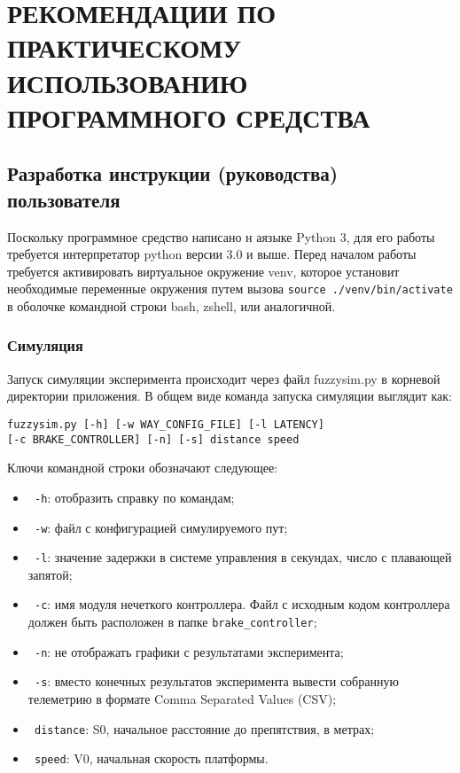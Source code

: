 \lstset{style=pythoninlinestyle}

\section{РЕКОМЕНДАЦИИ ПО ПРАКТИЧЕСКОМУ ИСПОЛЬЗОВАНИЮ ПРОГРАММНОГО СРЕДСТВА}
\label{sec:manual}

\subsection{Разработка инструкции (руководства) пользователя}
\label{sub:manual:1}

Поскольку программное средство написано н аязыке Python 3, для его работы требуется интерпретатор python версии 3.0 и выше. Перед началом работы  требуется активировать виртуальное окружение venv, которое установит необходимые переменные окружения путем вызова \lstinline!source ./venv/bin/activate! в оболочке командной строки bash, zshell, или аналогичной.

\subsubsection{Симуляция}

Запуск симуляции эксперимента происходит через файл fuzzysim.py в корневой директории приложения. В общем виде команда запуска симуляции выглядит как:

\begin{lstlisting}[style=pythonstyle,caption={  }, label=lst:func:1]
  fuzzysim.py [-h] [-w WAY_CONFIG_FILE] [-l LATENCY]                   [-c BRAKE_CONTROLLER] [-n] [-s] distance speed
\end{lstlisting}

Ключи командной строки обозначают следующее:

\begin{itemize}
	\item \lstinline! -h!: отобразить справку по командам;
	\item \lstinline! -w!: файл с конфигурацией симулируемого пут;
	\item \lstinline! -l!: значение задержки в системе управления в секундах, число с плавающей запятой;
	\item \lstinline! -c!: имя модуля нечеткого контроллера. Файл с исходным кодом контроллера должен быть расположен в папке \lstinline!brake_controller!;
	\item \lstinline! -n!: не отображать графики с результатами эксперимента;
	\item \lstinline! -s!: вместо конечных результатов эксперимента вывести собранную телеметрию в формате Comma Separated Values (CSV);
	\item \lstinline! distance!: S0, начальное расстояние до препятствия, в метрах;
	\item \lstinline! speed!: V0, начальная скорость платформы.
\end{itemize}

